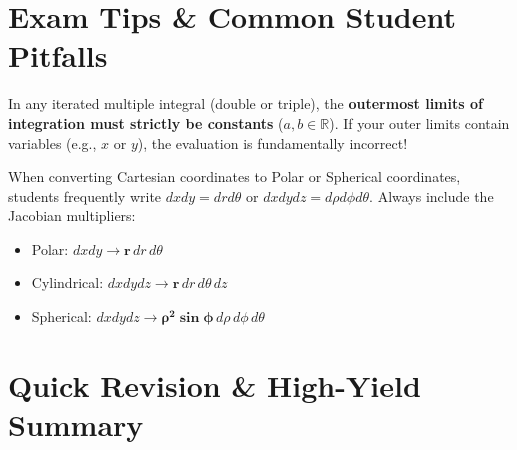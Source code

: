 \section{Exam Tips \& Common Student Pitfalls}

\begin{examtip}
In any iterated multiple integral (double or triple), the \textbf{outermost limits of integration must strictly be constants} ($a, b \in \mathbb{R}$). If your outer limits contain variables (e.g., $x$ or $y$), the evaluation is fundamentally incorrect!
\end{examtip}

\begin{commonmistake}
When converting Cartesian coordinates to Polar or Spherical coordinates, students frequently write $dx dy = dr d\theta$ or $dx dy dz = d\rho d\phi d\theta$.
Always include the Jacobian multipliers:
\begin{itemize}
    \item Polar: $dx dy \to \mathbf{r}\,dr\,d\theta$
    \item Cylindrical: $dx dy dz \to \mathbf{r}\,dr\,d\theta\,dz$
    \item Spherical: $dx dy dz \to \mathbf{\rho^2 \sin\phi}\,d\rho\,d\phi\,d\theta$
\end{itemize}
\end{commonmistake}

\section{Quick Revision \& High-Yield Summary}

